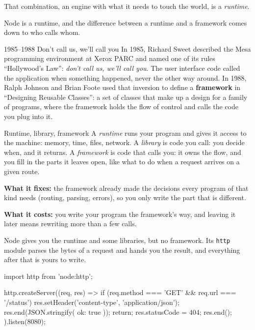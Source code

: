 That combination, an engine with what it needs to touch the world, is a
\emph{runtime}.

Node is a runtime, and the difference between a runtime and a framework comes
down to who calls whom.

\begin{history}{1985--1988 \textperiodcentered{} Don't call us, we'll call you}
In 1985, Richard Sweet described the Mesa programming environment at Xerox
PARC and named one of its rules ``Hollywood's Law'': \emph{don't call us,
we'll call you}. The user interface code called the application when something
happened, never the other way around. In 1988, Ralph Johnson and Brian Foote
used that inversion to define a \textbf{framework} in ``Designing Reusable
Classes'': a set of classes that make up a design for a family of programs,
where the framework holds the flow of control and calls the code you plug into
it.
\end{history}

\begin{concept}{Runtime, library, framework}
A \emph{runtime} runs your program and gives it access to the machine: memory,
time, files, network. A \emph{library} is code you call: you decide when, and
it returns. A \emph{framework} is code that calls you: it owns the flow, and you
fill in the parts it leaves open, like what to do when a request arrives on a
given route.

\textbf{What it fixes:} the framework already made the decisions every program
of that kind needs (routing, parsing, errors), so you only write the part that
is different.

\textbf{What it costs:} you write your program the framework's way, and leaving
it later means rewriting more than a few calls.
\end{concept}

Node gives you the runtime and some libraries, but no framework. Its
\texttt{http} module parses the bytes of a request and hands you the result,
and everything after that is yours to write.

\begin{code}
import http from 'node:http';

http.createServer((req, res) => {
  if (req.method === 'GET' && req.url === '/status') {
    res.setHeader('content-type', 'application/json');
    res.end(JSON.stringify({ ok: true }));
    return;
  }
  res.statusCode = 404;
  res.end();
}).listen(8080);
\end{code}

